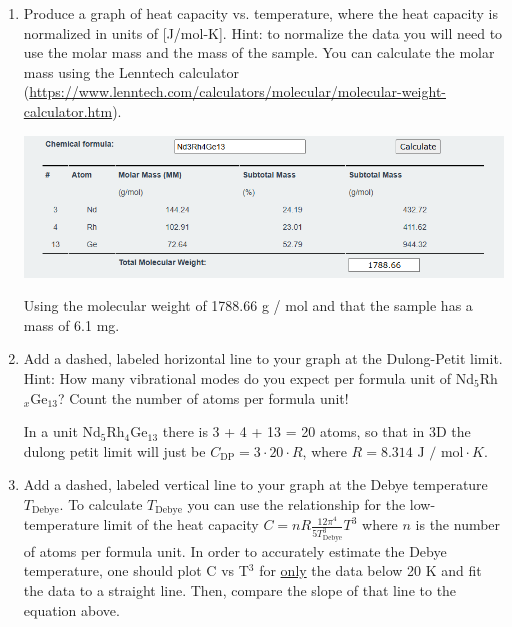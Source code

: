 \begin{enumerate}
    \item Produce a graph of heat capacity vs. temperature, where the heat capacity is normalized in units of [J/mol-K]. Hint: to normalize the data you will need to use the molar mass and the mass of the sample. You can calculate the molar mass using the Lenntech calculator (\url{https://www.lenntech.com/calculators/molecular/molecular-weight-calculator.htm}).

    \divider
    
    \begin{center}
        \includegraphics[width = 0.8\linewidth]{Images/molar-mass-hw1.png}
    \end{center}

    Using the molecular weight of 1788.66 g / mol and that the sample has a mass of 6.1 mg.

    \item Add a dashed, labeled horizontal line to your graph at the Dulong-Petit limit. Hint: How many vibrational modes do you expect per formula unit of Nd$_5$Rh$_x$Ge$_{13}$? Count the number of atoms per formula unit!

    \divider 

    In a unit Nd$_5$Rh$_4$Ge$_{13}$ there is 3 + 4 + 13 = 20 atoms, so that in 3D the dulong petit limit will just be $C_{\text{DP}} = 3 \cdot 20 \cdot R$, where $R = 8.314  \text{ J / mol}\cdot K $.

    \item Add a dashed, labeled vertical line to your graph at the Debye temperature $T_{\text{Debye}}$. To calculate $T_{\text{Debye}}$ you can use the relationship for the low-temperature limit of the heat capacity $C = nR \frac{12\pi^4}{5 T_{\text{Debye}}^3} T^3$ where $n$ is the number of atoms per formula unit. In order to accurately estimate the Debye temperature, one should plot C vs T$^3$ for \underline{only} the data below 20 K and fit the data to a straight line. Then, compare the slope of that line to the equation above.
    \divider


\end{enumerate}
